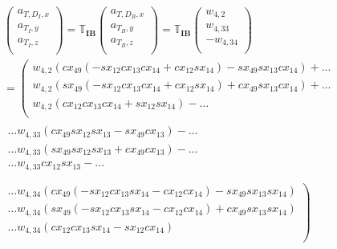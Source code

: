 \begin{multline} \label{eq:DandTInertial}
\begin{pmatrix}
a_{T,D_{I},x}\\
a_{T_{I},y}\\
a_{T_{I},z}\\
\end{pmatrix}
=
\mathbb{T}_{\mathbf{IB}}
\begin{pmatrix}
a_{T,D_{B},x}\\
a_{T_{B},y}\\
a_{T_{B},z}\\
\end{pmatrix}=
\mathbb{T}_{\mathbf{IB}}
\begin{pmatrix}
w_{4,2}\\
w_{4,33}\\
-w_{4,34}\\
\end{pmatrix}\\
=
\left(
\begin{matrix}
w_{4,2} \left( cx_{49}\left(-sx_{12} cx_{13} cx_{14} +cx_{12} sx_{14} \right)-sx_{49} sx_{13} cx_{14} \right)  + \dots  \\
w_{4,2} \left( sx_{49}\left(-sx_{12} cx_{13} cx_{14} +cx_{12} sx_{14} \right)+cx_{49} sx_{13} cx_{14}  \right)  + \dots \\
w_{4,2} \left(cx_{12} cx_{13} cx_{14} +sx_{12} sx_{14}  \right)  - \dots \\
\end{matrix} \right.
\\
\begin{matrix}
\dotsc  w_{4,33} \left( cx_{49} sx_{12} sx_{13} -sx_{49} cx_{13}\right)  - \dots \\
\dotsc  w_{4,33} \left( sx_{49} sx_{12} sx_{13} +cx_{49} cx_{13} \right)  - \dots \\
\dotsc  w_{4,33} cx_{12} sx_{13} - \dots \\
\end{matrix}
\\
\left.
\begin{matrix}
\dotsc w_{4,34} \left( cx_{49}\left(-sx_{12} cx_{13} sx_{14} -cx_{12} cx_{14} \right)-sx_{49} sx_{13} sx_{14} \right) \\
\dotsc w_{4,34} \left(sx_{49}\left(-sx_{12} cx_{13} sx_{14} -cx_{12} cx_{14} \right)+cx_{49} sx_{13} sx_{14} \right) \\
\dotsc w_{4,34} \left( cx_{12} cx_{13} sx_{14} -sx_{12} cx_{14} \right) \\
\end{matrix}
\right)\\
\end{multline}


